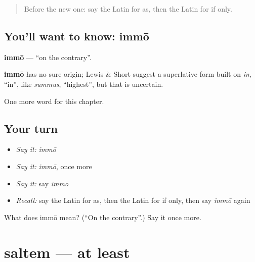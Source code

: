 \label{lesson:LA-C265-immo}



\begin{quote}
Before the new one: say the Latin for as, then the Latin for if only.
\end{quote}

\subsection*{You'll want to know: immō}
\textbf{immō} — \textquotedblleft{}on the contrary\textquotedblright{}.

\begin{cousinweb}
\textbf{immō} has no sure origin; Lewis \& Short suggest a superlative form built on \emph{in}, \textquotedblleft{}in\textquotedblright{}, like \emph{summus}, \textquotedblleft{}highest\textquotedblright{}, but that is uncertain.
\end{cousinweb}

\begin{grammarlens}[title={What you've built}]
One more word for this chapter.
\end{grammarlens}

\subsection*{Your turn}
\begin{itemize}
\raggedright
  \item \emph{Say it:} \emph{immō}
  \item \emph{Say it:} \emph{immō}, once more
  \item \emph{Say it:} say \emph{immō}
  \item \emph{Recall:} say the Latin for as, then the Latin for if only, then say \emph{immō} again
\end{itemize}

\begin{tcolorbox}[breakable,colback=teal!4,colframe=teal!35!black,title={Before you move on}]
What does immō mean? (\textquotedblleft{}On the contrary\textquotedblright{}.) Say it once more.
\end{tcolorbox}
\section[saltem]{saltem — at least}

\label{lesson:LA-C265-saltem}



